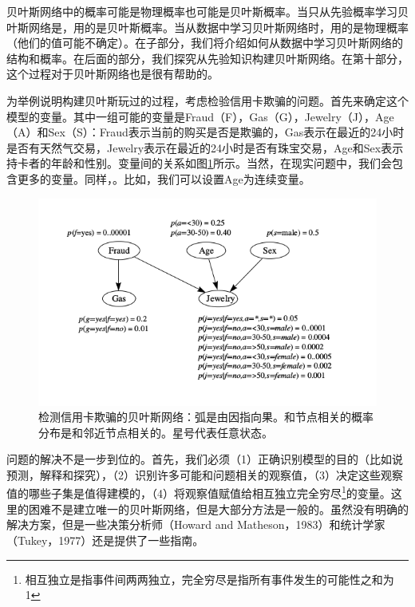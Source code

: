 \documentclass[10pt,a4paper]{article}
\begin{document}
\begin{CJK*}{UTF8}{gkai}
贝叶斯网络中的概率可能是物理概率也可能是贝叶斯概率。当只从先验概率学习贝叶斯网络是，用的是贝叶斯概率。当从数据中学习贝叶斯网络时，用的是物理概率（他们的值可能不确定）。在子部分，我们将介绍如何从数据中学习贝叶斯网络的结构和概率。在后面的部分，我们探究从先验知识构建贝叶斯网络。在第十部分，这个过程对于贝叶斯网络也是很有帮助的。


为举例说明构建贝叶斯玩过的过程，考虑检验信用卡欺骗的问题。首先来确定这个模型的变量。其中一组可能的变量是Fraud（F），Gas（G），Jewelry（J），Age（A）和Sex（S）：Fraud表示当前的购买是否是欺骗的，Gas表示在最近的24小时是否有天然气交易，Jewelry表示在最近的24小时是否有珠宝交易，Age和Sex表示持卡者的年龄和性别。变量间的关系如图\ref{fig:structure}所示。当然，在现实问题中，我们会包含更多的变量。同样，。比如，我们可以设置Age为连续变量。
\begin{figure}[!htbp]
	\centering
    	\includegraphics[scale=0.4]{figs/structure.png}
	\caption{检测信用卡欺骗的贝叶斯网络：弧是由因指向果。和节点相关的概率分布是和邻近节点相关的。星号代表任意状态。}    
	\label{fig:structure}
\end{figure}

问题的解决不是一步到位的。首先，我们必须（1）正确识别模型的目的（比如说预测，解释和探究），（2）识别许多可能和问题相关的观察值，（3）决定这些观察值的哪些子集是值得建模的，（4）将观察值赋值给相互独立完全穷尽\footnote{相互独立是指事件间两两独立，完全穷尽是指所有事件发生的可能性之和为1}的变量。这里的困难不是建立唯一的贝叶斯网络，但是大部分方法是一般的。虽然没有明确的解决方案，但是一些决策分析师（Howard and Matheson，1983）和统计学家（Tukey，1977）还是提供了一些指南。



\end{CJK*}
\end{document}
